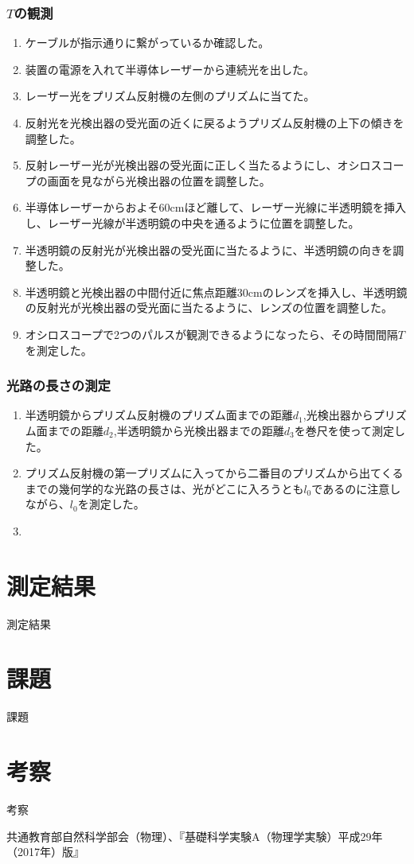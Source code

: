 \documentclass{jsarticle}
\begin{document}
\subsubsection{$T$の観測}
\begin{enumerate}
    \item ケーブルが指示通りに繋がっているか確認した。
    \item 装置の電源を入れて半導体レーザーから連続光を出した。
    \item レーザー光をプリズム反射機の左側のプリズムに当てた。
    \item 反射光を光検出器の受光面の近くに戻るようプリズム反射機の上下の傾きを調整した。
    \item 反射レーザー光が光検出器の受光面に正しく当たるようにし、オシロスコープの画面を見ながら光検出器の位置を調整した。
    \item 半導体レーザーからおよそ60cmほど離して、レーザー光線に半透明鏡を挿入し、レーザー光線が半透明鏡の中央を通るように位置を調整した。
    \item 半透明鏡の反射光が光検出器の受光面に当たるように、半透明鏡の向きを調整した。
    \item 半透明鏡と光検出器の中間付近に焦点距離30cmのレンズを挿入し、半透明鏡の反射光が光検出器の受光面に当たるように、レンズの位置を調整した。
    \item オシロスコープで2つのパルスが観測できるようになったら、その時間間隔$T$を測定した。
\end{enumerate}

\subsubsection{光路の長さの測定}
\begin{enumerate}
    \item 半透明鏡からプリズム反射機のプリズム面までの距離$d_1$,光検出器からプリズム面までの距離$d_2$,半透明鏡から光検出器までの距離$d_3$を巻尺を使って測定した。
    \item プリズム反射機の第一プリズムに入ってから二番目のプリズムから出てくるまでの幾何学的な光路の長さは、光がどこに入ろうとも$l_0$であるのに注意しながら、$l_0$を測定した。
    \item 
\end{enumerate}

\section{測定結果}

測定結果

\section{課題}

課題

\section{考察}

考察






\begin{thebibliography}{99}
     共通教育部自然科学部会（物理）、『基礎科学実験A（物理学実験）平成29年（2017年）版』
\end{thebibliography}
\end{document}
